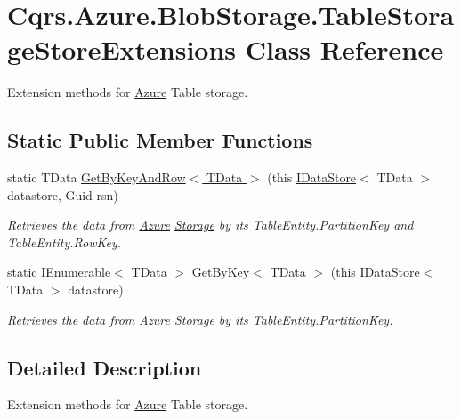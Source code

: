 \hypertarget{classCqrs_1_1Azure_1_1BlobStorage_1_1TableStorageStoreExtensions}{}\section{Cqrs.\+Azure.\+Blob\+Storage.\+Table\+Storage\+Store\+Extensions Class Reference}
\label{classCqrs_1_1Azure_1_1BlobStorage_1_1TableStorageStoreExtensions}


Extension methods for \hyperlink{namespaceCqrs_1_1Azure}{Azure} Table storage.  


\subsection*{Static Public Member Functions}
\begin{DoxyCompactItemize}
\item 
static T\+Data \hyperlink{classCqrs_1_1Azure_1_1BlobStorage_1_1TableStorageStoreExtensions_a31a5a94e2caf554d17cde68d274a57c2_a31a5a94e2caf554d17cde68d274a57c2}{Get\+By\+Key\+And\+Row$<$ T\+Data $>$} (this \hyperlink{interfaceCqrs_1_1DataStores_1_1IDataStore}{I\+Data\+Store}$<$ T\+Data $>$ datastore, Guid rsn)
\begin{DoxyCompactList}\small\item\em Retrieves the data from \hyperlink{namespaceCqrs_1_1Azure}{Azure} \hyperlink{namespaceCqrs_1_1Azure_1_1Storage}{Storage} by it\textquotesingle{}s Table\+Entity.\+Partition\+Key and Table\+Entity.\+Row\+Key. \end{DoxyCompactList}\item 
static I\+Enumerable$<$ T\+Data $>$ \hyperlink{classCqrs_1_1Azure_1_1BlobStorage_1_1TableStorageStoreExtensions_a773bb93cb6a1f7a5d8d0ff2bf245c655_a773bb93cb6a1f7a5d8d0ff2bf245c655}{Get\+By\+Key$<$ T\+Data $>$} (this \hyperlink{interfaceCqrs_1_1DataStores_1_1IDataStore}{I\+Data\+Store}$<$ T\+Data $>$ datastore)
\begin{DoxyCompactList}\small\item\em Retrieves the data from \hyperlink{namespaceCqrs_1_1Azure}{Azure} \hyperlink{namespaceCqrs_1_1Azure_1_1Storage}{Storage} by it\textquotesingle{}s Table\+Entity.\+Partition\+Key. \end{DoxyCompactList}\end{DoxyCompactItemize}


\subsection{Detailed Description}
Extension methods for \hyperlink{namespaceCqrs_1_1Azure}{Azure} Table storage. 



